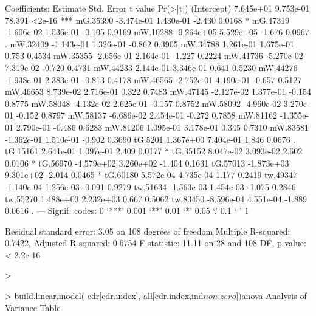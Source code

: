 Coefficients:
              Estimate Std. Error t value Pr(>|t|)    
(Intercept)  7.645e+01  9.753e-01  78.391   <2e-16 ***
mG.35390    -3.474e-01  1.430e-01  -2.430   0.0168 *  
mG.47319    -1.606e-02  1.536e-01  -0.105   0.9169    
mW.10288    -9.264e+05  5.529e+05  -1.676   0.0967 .  
mW.32409    -1.143e-01  1.326e-01  -0.862   0.3905    
mW.34788     1.261e-01  1.675e-01   0.753   0.4534    
mW.35355    -2.656e-01  2.164e-01  -1.227   0.2224    
mW.41736    -5.270e-02  7.319e-02  -0.720   0.4731    
mW.44233     2.144e-01  3.346e-01   0.641   0.5230    
mW.44276    -1.938e-01  2.383e-01  -0.813   0.4178    
mW.46565    -2.752e-01  4.190e-01  -0.657   0.5127    
mW.46653     8.739e-02  2.716e-01   0.322   0.7483    
mW.47145    -2.127e-02  1.377e-01  -0.154   0.8775    
mW.58048    -4.132e-02  2.625e-01  -0.157   0.8752    
mW.58092    -4.960e-02  3.270e-01  -0.152   0.8797    
mW.58137    -6.686e-02  2.454e-01  -0.272   0.7858    
mW.81162    -1.355e-01  2.790e-01  -0.486   0.6283    
mW.81206     1.095e-01  3.178e-01   0.345   0.7310    
mW.83581    -1.362e-01  1.510e-01  -0.902   0.3690    
tG.5201      1.367e+00  7.404e-01   1.846   0.0676 .  
tG.15161     2.641e-01  1.097e-01   2.409   0.0177 *  
tG.35152     8.047e-02  3.093e-02   2.602   0.0106 *  
tG.56970    -4.579e+02  3.260e+02  -1.404   0.1631    
tG.57013    -1.873e+03  9.301e+02  -2.014   0.0465 *  
tG.60180     5.572e-04  4.735e-04   1.177   0.2419    
tw.49347    -1.140e-04  1.256e-03  -0.091   0.9279    
tw.51634    -1.563e-03  1.454e-03  -1.075   0.2846    
tw.55270     1.488e+03  2.232e+03   0.667   0.5062    
tw.83450    -8.596e-04  4.551e-04  -1.889   0.0616 .  
---
Signif. codes:  0 ‘***’ 0.001 ‘**’ 0.01 ‘*’ 0.05 ‘.’ 0.1 ‘ ’ 1

Residual standard error: 3.05 on 108 degrees of freedom
Multiple R-squared:  0.7422,	Adjusted R-squared:  0.6754 
F-statistic: 11.11 on 28 and 108 DF,  p-value: < 2.2e-16

>


> build.linear.model( cdr[cdr.index], all[cdr.index,ind$non.zero])$anova
Analysis of Variance Table

